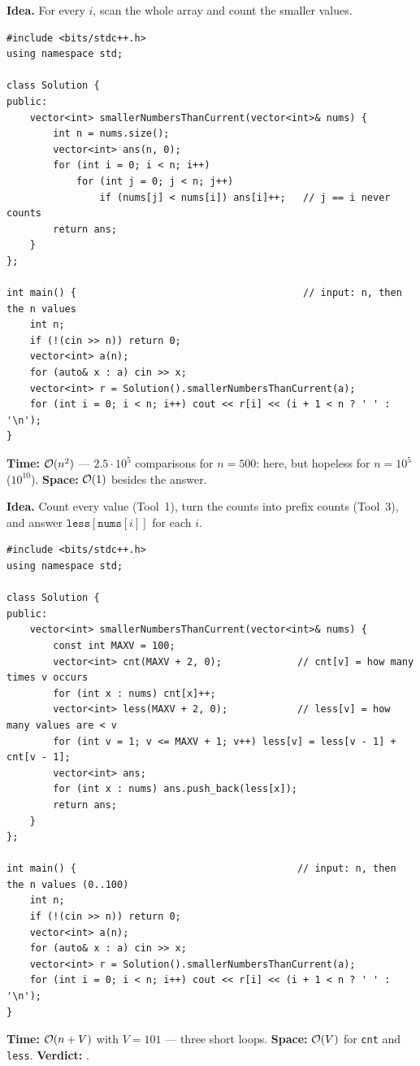 \begin{bruteforcebox}
\textbf{Idea.} For every $i$, scan the whole array and count the smaller values.
\begin{lstlisting}[style=cpp]
#include <bits/stdc++.h>
using namespace std;

class Solution {
public:
    vector<int> smallerNumbersThanCurrent(vector<int>& nums) {
        int n = nums.size();
        vector<int> ans(n, 0);
        for (int i = 0; i < n; i++)
            for (int j = 0; j < n; j++)
                if (nums[j] < nums[i]) ans[i]++;   // j == i never counts
        return ans;
    }
};

int main() {                                       // input: n, then the n values
    int n;
    if (!(cin >> n)) return 0;
    vector<int> a(n);
    for (auto& x : a) cin >> x;
    vector<int> r = Solution().smallerNumbersThanCurrent(a);
    for (int i = 0; i < n; i++) cout << r[i] << (i + 1 < n ? ' ' : '\n');
}
\end{lstlisting}
\begin{complexitybox}
\textbf{Time:} $\mathcal{O}(n^2)$ --- $2.5\cdot10^5$ comparisons for $n = 500$: \ac{} here, but hopeless for $n = 10^5$ ($10^{10}$). \textbf{Space:} $\mathcal{O}(1)$ besides the answer.
\end{complexitybox}
\end{bruteforcebox}

\begin{algorithmbox}
\textbf{Idea.} Count every value (Tool~1), turn the counts into prefix counts (Tool~3), and answer $\texttt{less}[\texttt{nums}[i]]$ for each $i$.
\begin{lstlisting}[style=cpp]
#include <bits/stdc++.h>
using namespace std;

class Solution {
public:
    vector<int> smallerNumbersThanCurrent(vector<int>& nums) {
        const int MAXV = 100;
        vector<int> cnt(MAXV + 2, 0);             // cnt[v] = how many times v occurs
        for (int x : nums) cnt[x]++;
        vector<int> less(MAXV + 2, 0);            // less[v] = how many values are < v
        for (int v = 1; v <= MAXV + 1; v++) less[v] = less[v - 1] + cnt[v - 1];
        vector<int> ans;
        for (int x : nums) ans.push_back(less[x]);
        return ans;
    }
};

int main() {                                      // input: n, then the n values (0..100)
    int n;
    if (!(cin >> n)) return 0;
    vector<int> a(n);
    for (auto& x : a) cin >> x;
    vector<int> r = Solution().smallerNumbersThanCurrent(a);
    for (int i = 0; i < n; i++) cout << r[i] << (i + 1 < n ? ' ' : '\n');
}
\end{lstlisting}
\begin{complexitybox}
\textbf{Time:} $\mathcal{O}(n + V)$ with $V = 101$ --- three short loops. \textbf{Space:} $\mathcal{O}(V)$ for \texttt{cnt} and \texttt{less}. \textbf{Verdict:} \ac{}.
\end{complexitybox}
\end{algorithmbox}

